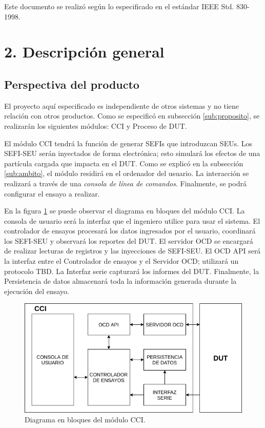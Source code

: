 \documentclass[
11pt, %
codirector, %
]{charter}
\begin{document}
Este documento se realizó según lo especificado en el estándar IEEE Std. 830-1998.

\section{2. Descripción general}
\label{seb:descripcion}

\subsection{Perspectiva del producto}
\label{sub:perspectiva}

El proyecto aquí especificado es independiente de otros sistemas y no tiene relación con otros productos.
Como se especificó en subsección \ref{sub:proposito}, se realizarán los siguientes módulos: CCI y Proceso de DUT.

El módulo CCI tendrá la función de generar SEFIs que introduzcan SEUs.
Los SEFI-SEU serán inyectados de forma electrónica; esto simulará los efectos de una partícula cargada que impacta en el DUT.
Como se explicó en la subsección \ref{sub:ambito}, el módulo residirá en el ordenador del usuario.
La interacción se realizará a través de una \emph{consola de línea de comandos}.
Finalmente, se podrá configurar el ensayo a realizar.

En la figura \ref{fig:CCIbloques} se puede observar el diagrama en bloques del módulo CCI.
La consola de usuario será la interfaz que el ingeniero utilice para usar el sistema.
El controlador de ensayos procesará los datos ingresados por el usuario, coordinará los SEFI-SEU y observará los reportes del DUT.
El servidor OCD se encargará de realizar lecturas de registros y las inyecciones de SEFI-SEU.
El OCD API será la interfaz entre el Controlador de ensayos y el Servidor OCD; utilizará un protocolo TBD.
La Interfaz serie capturará los informes del DUT.
Finalmente, la Persistencia de datos almacenará toda la información generada durante la ejecución del ensayo.

\begin{figure}[h!]
	\centering
	\includegraphics[width=\textwidth]{./Figuras/CCIbloques.png}
	\caption{Diagrama en bloques del módulo CCI.}
	\label{fig:CCIbloques}
\end{figure}
\end{document}
